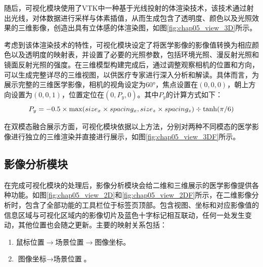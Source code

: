 随后，可视化模块使用了VTK中一种基于光线投射的体渲染技术，该技术通过射出光线，对体数据进行采样与体素插值，从而生成包含了透明度、颜色以及光照效果的三维影像，创造出具有立体感的体渲染图，如图\ref{fig:chap05_view_3D}所示。

考虑到该体渲染技术的特性，可视化模块设定了将医学影像的影像值转换为相应颜色以及透明度的映射表，并设置了必要的光照参数，包括环境光照、漫反射光照和镜面反射光照的强度。在三维模型构建完成后，通过调整观察相机的位置和方向，可以生成完整详尽的三维视图，以供医疗专家进行深入分析和解读。具体而言，为展示完整的三维医学影像，相机的视角设定为60°，焦点设置在\((0,0,0)\)，朝上方向设置为\((0,0,1)\)，位置定位在\((0,P_y,0)\)。其中\(P_y\)的计算方式如下：
\begin{equation}
  P_y = -0.5 \times \max(size_x \times spacing_x, size_z \times spacing_z) \div \tanh(\pi / 6)\\
\end{equation}

在双模态融合展示方面，可视化模块依据以上方法，分别对两种不同模态的医学影像进行独立的三维渲染并直接进行展示，如图\ref{fig:chap05_view_3DF}所示。

\subsection{影像分析模块}

在完成可视化模块的处理后，影像分析模块会给二维和三维展示的医学影像提供各种功能。如图\ref{fig:chap05_view_2D}和\ref{fig:chap05_view_2DF}所示，在二维影像分析时，包含了全部功能的工具栏位于标签页顶部。包含视图、坐标和对应影像值的信息区域与可视化区域内的影像切片及蓝色十字标记相互联动，任何一处发生变动，其他位置也会随之更新。主要的映射关系包括：
\begin{enumerate}
  \item \(\text{鼠标位置} \rightarrow \text{场景位置} \rightarrow \text{图像坐标}\)\label{en:chap05_1}。
  \item \(\text{图像坐标} \rightarrow \text{场景位置}\)\label{en:chap05_2}。
\end{enumerate}

